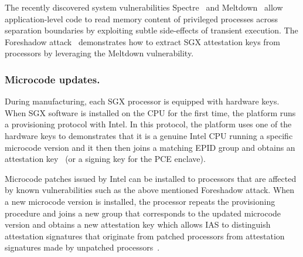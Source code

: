The recently discovered system vulnerabilities Spectre~\cite{Kocher2018spectre} and Meltdown~\cite{Lipp2018meltdown} allow application-level code to read memory content of privileged processes across separation boundaries by exploiting subtle side-effects of transient execution. The Foreshadow attack~\cite{foreshadow-usenix18} demonstrates how to extract SGX attestation keys from processors by leveraging the Meltdown vulnerability. 

\subsubsection{Microcode updates.}
During manufacturing, each SGX processor is equipped with hardware keys. When SGX software is installed on the CPU for the first time, the platform runs a provisioning protocol with Intel. In this protocol, the platform uses one of the hardware keys to demonstrates that it is a genuine Intel CPU running a specific microcode version and it then then joins a matching EPID group and obtains an attestation key~\cite{epid_attestation} (or a signing key for the PCE enclave). 

Microcode patches issued by Intel can be installed to processors that are affected by known vulnerabilities such as the above mentioned Foreshadow attack. When a new microcode version is installed, the processor repeats the provisioning procedure and joins a new group that corresponds to the updated microcode version and obtains a new attestation key which allows IAS to distinguish attestation signatures that originate from patched processors from attestation signatures made by unpatched processors~\cite{epid_attestation}.
